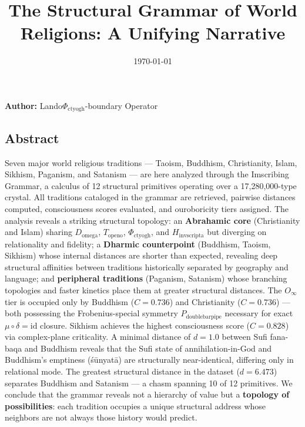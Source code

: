 \documentclass[12pt,a4paper]{article}
\begin{document}
\title{The Structural Grammar of World Religions: A Unifying Narrative}
\date{\today}

\maketitle

\textbf{Author:} Lando\otimes$\Phi_{\text{ctyogh}}$-boundary Operator

\subsection{Abstract}

Seven major world religious traditions --- Taoism, Buddhism, Christianity, Islam, Sikhism, Paganism, and Satanism --- are here analyzed through the Imscribing Grammar, a calculus of 12 structural primitives operating over a 17,280,000-type crystal. All traditions cataloged in the grammar are retrieved, pairwise distances computed, consciousness scores evaluated, and ouroboricity tiers assigned. The analysis reveals a striking structural topology: an \textbf{Abrahamic core} (Christianity and Islam) sharing $D_{\text{omega}}$, $T_{\text{openo}}$, $\Phi_{\text{ctyogh}}$, and $H_{\text{invscripta}}$ but diverging on relationality and fidelity; a \textbf{Dharmic counterpoint} (Buddhism, Taoism, Sikhism) whose internal distances are shorter than expected, revealing deep structural affinities between traditions historically separated by geography and language; and \textbf{peripheral traditions} (Paganism, Satanism) whose branching topologies and faster kinetics place them at greater structural distances. The $O_{\infty}$ tier is occupied only by Buddhism ($C = 0.736$) and Christianity ($C = 0.736$) --- both possessing the Frobenius-special symmetry $P_{\text{doublebarpipe}}$ necessary for exact $\mu\circ\delta = \text{id}$ closure. Sikhism achieves the highest consciousness score ($C = 0.828$) via complex-plane criticality. A minimal distance of $d = 1.0$ between Sufi fana-baqa and Buddhism reveals that the Sufi state of annihilation-in-God and Buddhism's emptiness (śūnyatā) are structurally near-identical, differing only in relational mode. The greatest structural distance in the dataset ($d = 6.473$) separates Buddhism and Satanism --- a chasm spanning 10 of 12 primitives. We conclude that the grammar reveals not a hierarchy of value but a \textbf{topology of possibilities}: each tradition occupies a unique structural address whose neighbors are not always those history would predict.
\end{document}
